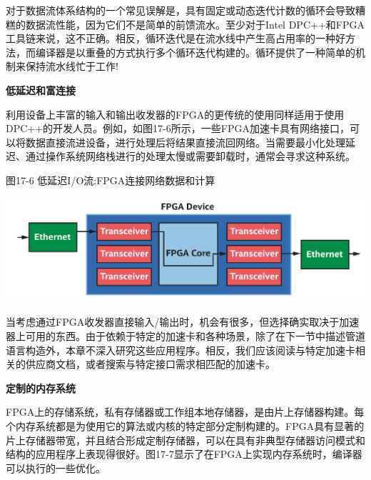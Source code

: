 \begin{tcolorbox}[colback=blue!5!white,colframe=blue!75!black, title=循环不是罪!]
对于数据流体系结构的一个常见误解是，具有固定或动态迭代计数的循环会导致糟糕的数据流性能，因为它们不是简单的前馈流水。至少对于Intel DPC++和FPGA工具链来说，这不正确。相反，循环迭代是在流水线中产生高占用率的一种好方法，而编译器是以重叠的方式执行多个循环迭代构建的。循环提供了一种简单的机制来保持流水线忙于工作!
\end{tcolorbox}

\hspace*{\fill} \par %
\textbf{低延迟和富连接}

利用设备上丰富的输入和输出收发器的FPGA的更传统的使用同样适用于使用DPC++的开发人员。例如，如图17-6所示，一些FPGA加速卡具有网络接口，可以将数据直接流进设备，进行处理后将结果直接流回网络。当需要最小化处理延迟、通过操作系统网络栈进行的处理太慢或需要卸载时，通常会寻求这种系统。\par

\hspace*{\fill} \par %
图17-6 低延迟I/O流:FPGA连接网络数据和计算
\begin{center}
	\includegraphics[width=1.0\textwidth]{content/chapter-17/images/7}
\end{center}

当考虑通过FPGA收发器直接输入/输出时，机会有很多，但选择确实取决于加速器上可用的东西。由于依赖于特定的加速卡和各种场景，除了在下一节中描述管道语言构造外，本章不深入研究这些应用程序。相反，我们应该阅读与特定加速卡相关的供应商文档，或者搜索与特定接口需求相匹配的加速卡。\par

\hspace*{\fill} \par %
\textbf{定制的内存系统}

FPGA上的存储系统，私有存储器或工作组本地存储器，是由片上存储器构建。每个内存系统都是为使用它的算法或内核的特定部分定制构建的。FPGA具有显著的片上存储器带宽，并且结合形成定制存储器，可以在具有非典型存储器访问模式和结构的应用程序上表现得很好。图17-7显示了在FPGA上实现内存系统时，编译器可以执行的一些优化。\par

